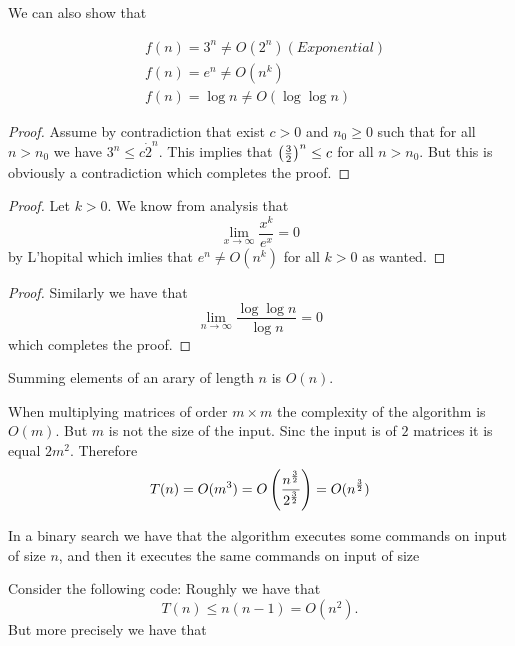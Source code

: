 \documentclass[11pt,a4paper]{article}
\begin{document}
We can also show that


\begin{align*}
    &f(n) = 3^n \neq O(2^n) (Exponential) \\
    &f(n) = e^n \neq O(n^k) \\
    &f(n) = \log n \neq O(\log \log n)
\end{align*}

\begin{proof}
    Assume by contradiction that exist $c > 0$ and $n_0 \geq 0$ such that
    for all $n > n_0$ we have $3^n \le c \dot 2^n$.
    This implies that $\del{\frac 32}^n \le c$ for all $n > n_0$.
    But this is obviously a contradiction which completes the proof.
\end{proof}

\begin{proof}
    Let $k > 0$.
    We know from analysis that
    \[
        \lim_{x \to \infty} \frac{x^k}{e^x} = 0
    \]
    by L'hopital which imlies that $e^n \neq O(n^k)$ for all $k > 0$
    as wanted.
\end{proof}

\begin{proof}
    Similarly we have that
    \[
        \lim_{n \to \infty} \frac{\log \log n}{\log n} = 0
    \]
    which completes the proof.
\end{proof}

\begin{example}
    Summing elements of an arary of length $n$ is $O(n)$.
\end{example}

\begin{example}
    When multiplying matrices of order $m \times m$ the complexity
    of the algorithm is $O(m)$.
    But $m$ is not the size of the input.
    Sinc the input is of $2$ matrices it is equal $2m^2$.
    Therefore
    \[
        T(n) = O(m^3) = O\del{\frac{n^{\frac 32}}{2^{\frac 32}}} =
        O(n^{\frac 32})
    \]
\end{example}

\begin{example}
    In a binary search we have that the algorithm executes some commands
    on input of size $n$, and then it executes the same commands on input
    of size
\end{example}

\begin{example}
    Consider the following code:
    Roughly we have that
    \[
        T(n) \le n (n - 1) = O(n^2).
    \]
    But more precisely we have that
\end{example}
\end{document}
